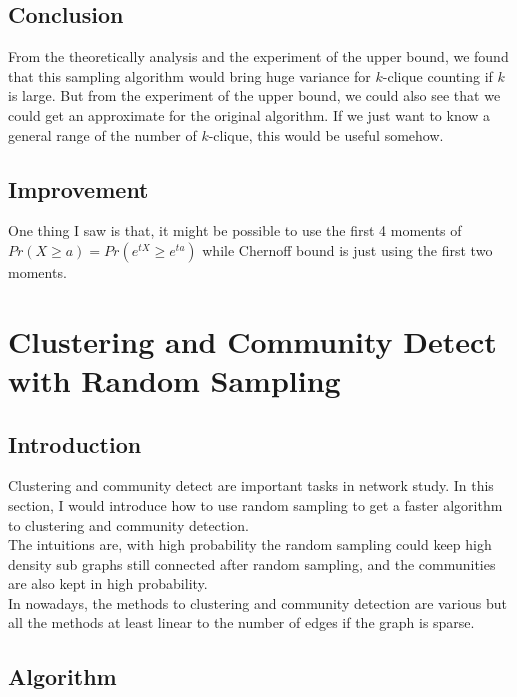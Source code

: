 \subsection{Conclusion}
From the theoretically analysis and the experiment of the upper bound, we found that this sampling algorithm would bring huge variance for $k$-clique counting if $k$ is large. But from the experiment of the upper bound, we could also see that we could get an approximate for the original algorithm. If we just want to know a general range of the number of $k$-clique, this would be useful somehow.

\subsection{Improvement}
One thing I saw is that, it might be possible to use the first 4 moments of $Pr(X \geq a) = Pr(e^{tX} \geq e^{ta})$ while Chernoff bound is just using the first two moments.

\section{Clustering and Community Detect with Random Sampling}\label{sec:cluster}
\subsection{Introduction}
Clustering and community detect are important tasks in network study. In this section, I would introduce how to use random sampling to get a faster algorithm to clustering and community detection. \\
The intuitions are, with high probability the random sampling could keep high density sub graphs still connected after random sampling, and the communities are also kept in high probability. \\
In nowadays, the methods to clustering and community detection are various but all the methods at least linear to the number of edges if the graph is sparse.


\subsection{Algorithm}

